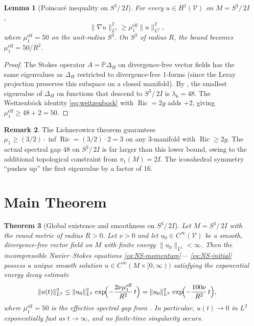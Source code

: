 \documentclass[11pt,a4paper]{article}
\theoremstyle{plain}
\newtheorem{theorem}{Theorem}[section]
\newtheorem{lemma}[theorem]{Lemma}
\theoremstyle{definition}
\newtheorem{remark}[theorem]{Remark}
\DeclareMathOperator{\Ric}{Ric}
\newcommand{\Lap}{\Delta}                 %
\newcommand{\DS}{S^3\!/\,2I}             %
\newcommand{\BI}{2I}                      %
\newcommand{\norm}[1]{\lVert #1 \rVert}
\begin{document}
\begin{lemma}[Poincar\'{e} inequality on $\DS$]\label{lem:poincare}
For every $u \in H^1(\mathcal{V})$ on $M = \DS$,
\begin{equation}\label{eq:poincare}
  \norm{\nabla u}_{L^2}^2 \ge \mu_1^{\text{eff}} \norm{u}_{L^2}^2,
\end{equation}
where $\mu_1^{\text{eff}} = 50$ on the unit-radius $S^3$.  On $S^3$ of
radius $R$, the bound becomes $\mu_1^{\text{eff}} = 50/R^2$.
\end{lemma}

\begin{proof}
The Stokes operator $A = \mathbb{P}\Lap_H$ on divergence-free vector fields
has the same eigenvalues as $\Lap_H$ restricted to divergence-free
$1$-forms (since the Leray projection preserves this subspace on a closed
manifold).  By , the smallest eigenvalue of $\Lap_H$ on
functions that descend to $\DS$ is $\lambda_6 = 48$.  The Weitzenb\"{o}ck
identity \eqref{eq:weitzenbock} with $\Ric = 2g$ adds $+2$, giving
$\mu_1^{\text{eff}} \ge 48 + 2 = 50$.
\end{proof}

\begin{remark}
The Lichnerowicz theorem guarantees $\mu_1 \ge (3/2) \cdot \inf \Ric
= (3/2) \cdot 2 = 3$ on any $3$-manifold with $\Ric \ge 2g$.  The actual
spectral gap $48$ on $\DS$ is far larger than this lower bound, owing to the
additional topological constraint from $\pi_1(M) = \BI$.  The icosahedral
symmetry ``pushes up'' the first eigenvalue by a factor of $16$.
\end{remark}

\section{Main Theorem}\label{sec:mainproof}

\begin{theorem}[Global existence and smoothness on
$\DS$]\label{thm:main}
Let $M = \DS$ with the round metric of radius $R > 0$.  Let $\nu > 0$ and
let $u_0 \in C^\infty(\mathcal{V})$ be a smooth, divergence-free vector field
on $M$ with finite energy $\norm{u_0}_{L^2} < \infty$.  Then the
incompressible Navier--Stokes equations \eqref{eq:NS-momentum}---%
\eqref{eq:NS-initial} possess a unique smooth solution
$u \in C^\infty(M \times [0, \infty))$ satisfying the exponential energy
decay estimate
\begin{equation}\label{eq:energydecay}
  \norm{u(t)}_{L^2}^2
  \le \norm{u_0}_{L^2}^2\, \exp\!\Bigl(-\frac{2\nu \mu_1^{\text{eff}}}{R^2}
      \, t\Bigr)
  = \norm{u_0}_{L^2}^2\, \exp\!\Bigl(-\frac{100\nu}{R^2}\, t\Bigr),
\end{equation}
where $\mu_1^{\text{eff}} = 50$ is the effective spectral gap from
.  In particular, $u(t) \to 0$ in $L^2$ exponentially
fast as $t \to \infty$, and no finite-time singularity occurs.
\end{theorem}
\end{document}
